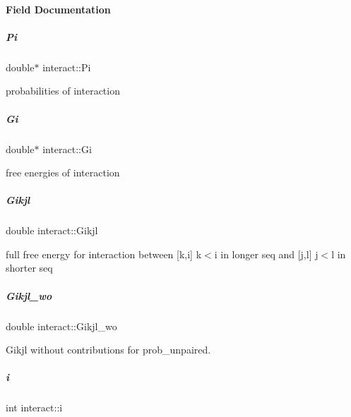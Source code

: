 \paragraph{Field Documentation}
\mbox{\label{group__data__structures_a1fc8b3860c083f164daa9712690a3a56}} 
\subparagraph{\texorpdfstring{Pi}{Pi}}
{\footnotesize\ttfamily double$\ast$ interact\+::\+Pi}



probabilities of interaction 

\mbox{\label{group__data__structures_a54f8183542fff4c32ab7ace49a16c02c}} 
\subparagraph{\texorpdfstring{Gi}{Gi}}
{\footnotesize\ttfamily double$\ast$ interact\+::\+Gi}



free energies of interaction 

\mbox{\label{group__data__structures_ad58303190f9e085c3ab59890cbf61223}} 
\subparagraph{\texorpdfstring{Gikjl}{Gikjl}}
{\footnotesize\ttfamily double interact\+::\+Gikjl}



full free energy for interaction between \mbox{[}k,i\mbox{]} k$<$i in longer seq and \mbox{[}j,l\mbox{]} j$<$l in shorter seq 

\mbox{\label{group__data__structures_a41793812abae560805414761fec398fe}} 
\subparagraph{\texorpdfstring{Gikjl\+\_\+wo}{Gikjl\_wo}}
{\footnotesize\ttfamily double interact\+::\+Gikjl\+\_\+wo}



Gikjl without contributions for prob\+\_\+unpaired. 

\mbox{\label{group__data__structures_ab6d031a21388be8763b75ea74c937f17}} 
\subparagraph{\texorpdfstring{i}{i}}
{\footnotesize\ttfamily int interact\+::i}



